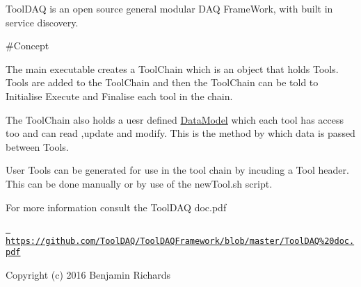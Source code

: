 Tool\+DAQ is an open source general modular DAQ Frame\+Work, with built in service discovery.

 \#\+Concept 


The main executable creates a Tool\+Chain which is an object that holds Tools. Tools are added to the Tool\+Chain and then the Tool\+Chain can be told to Initialise Execute and Finalise each tool in the chain.

The Tool\+Chain also holds a uesr defined \mbox{\hyperlink{classDataModel}{Data\+Model}} which each tool has access too and can read ,update and modify. This is the method by which data is passed between Tools.

User Tools can be generated for use in the tool chain by incuding a Tool header. This can be done manually or by use of the new\+Tool.\+sh script.

For more information consult the Tool\+DAQ doc.\+pdf

\href{https://github.com/ToolDAQ/ToolDAQFramework/blob/master/ToolDAQ\%20doc.pdf}{\texttt{ https\+://github.\+com/\+Tool\+DAQ/\+Tool\+DAQFramework/blob/master/\+Tool\+DAQ\%20doc.\+pdf}}

Copyright (c) 2016 Benjamin Richards 